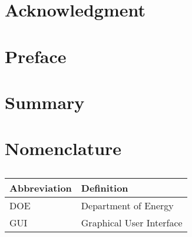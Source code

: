 \documentclass[pdf,12pt,report,strict]{SANDreport}
\title{}
\author{}		%
\date{}		%
\begin{document}
    \maketitle

    \begin{abstract}
    \end{abstract}


    \clearpage
    \chapter*{Acknowledgment}


    \cleardoublepage		%
    \tableofcontents
    \listoffigures
    \listoftables


    \clearpage
    \chapter*{Preface}


    \clearpage
    \chapter*{Summary}


    \clearpage
    \chapter*{Nomenclature}
    \begin{table}[ht]
    	\caption[]{}
    	\bigskip
	\begin{tabularx}{\textwidth}{l l}
		\hline
		Abbreviation  & Definition \\
		\hline \hline
                DOE & Department of Energy \\ \hline
                GUI & Graphical User Interface \\ \hline
	    \end{tabularx}
	    \label{nomenclature}
	\end{table}
\end{document}
